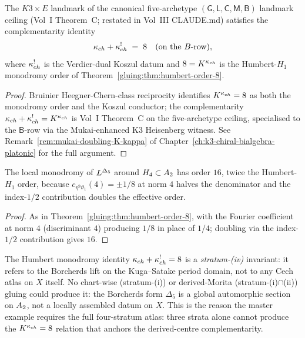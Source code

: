 \begin{theorem}
\label{gluing:thm:B-row-complementarity}
The $K3 \times E$ landmark of the canonical five-archetype
$(\mathsf G, \mathsf L, \mathsf C, \mathsf M, \mathsf B)$ landmark
ceiling (Vol~I Theorem~C; restated in Vol~III CLAUDE.md) satisfies
the complementarity identity
\[
 \kappa_{ch} + \kappa_{ch}^{!} \;=\; 8 \quad\text{(on the}\ B\text{-row)},
\]
where $\kappa_{ch}^{!}$ is the Verdier-dual Koszul datum and $8 = K^{\kappa_{ch}}$
is the Humbert-$H_1$ monodromy order of
Theorem~\ref{gluing:thm:humbert-order-8}.
\end{theorem}

\begin{proof}
Bruinier Heegner-Chern-class reciprocity identifies $K^{\kappa_{ch}} = 8$ as
both the monodromy order and the Koszul conductor; the
complementarity $\kappa_{ch} + \kappa_{ch}^! = K^{\kappa_{ch}}$ is Vol~I Theorem~C on the
five-archetype ceiling, specialised to the $\mathsf B$-row via the
Mukai-enhanced K3 Heisenberg witness. See
Remark~\ref{rem:mukai-doubling-K-kappa} of
Chapter~\ref{ch:k3-chiral-bialgebra-platonic} for the full argument.
\end{proof}

\begin{corollary}
\label{gluing:cor:H4-order-16}
The local monodromy of $L^{\Delta_5}$ around $H_4 \subset
A_2$ has order $16$, twice the Humbert-$H_1$ order,
because $c_{\eta^9 \vartheta_1}(4) = \pm 1/8$ at norm $4$ halves the
denominator and the index-$1/2$ contribution doubles the effective
order.
\end{corollary}

\begin{proof}
As in Theorem~\ref{gluing:thm:humbert-order-8}, with the Fourier
coefficient at norm $4$ (discriminant $4$) producing $1/8$ in place
of $1/4$; doubling via the index-$1/2$ contribution gives $16$.
\end{proof}

\begin{remark}
\label{gluing:rem:iv-invisible-cech}
The Humbert monodromy identity $\kappa_{ch} + \kappa_{ch}^! = 8$ is a
\emph{stratum-(iv)} invariant: it refers to the Borcherds lift on
the Kuga--Satake period domain, not to any Cech atlas on $X$ itself.
No chart-wise (stratum-(i)) or derived-Morita (stratum-(i)$\cap$(ii))
gluing could produce it: the Borcherds form $\Delta_5$ is a global
automorphic section on $A_2$, not a locally assembled
datum on $X$. This is the reason the master example requires the
full four-stratum atlas: three strata alone cannot produce the
$K^{\kappa_{ch}} = 8$ relation that anchors the derived-centre
complementarity.
\end{remark}

